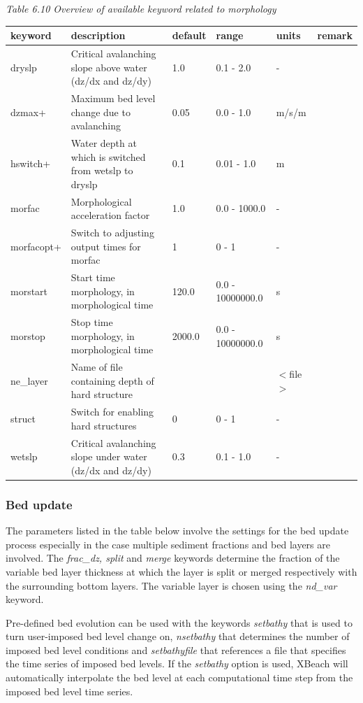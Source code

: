 \documentclass{article}
\begin{document}
\noindent \textit{Table 6.10 Overview of available keyword related to morphology}

\begin{tabular}{|p{0.7in}|p{1.0in}|p{0.6in}|p{0.8in}|p{0.5in}|p{0.6in}|} \hline 
keyword & description & default & range & units & remark \\ \hline 
dryslp & Critical avalanching slope above water (dz/dx and dz/dy) & 1.0 & 0.1 - 2.0 & - &  \\ \hline 
dzmax+ & Maximum bed level change due to avalanching & 0.05 & 0.0 - 1.0 & m/s/m &  \\ \hline 
hswitch+ & Water depth at which is switched from wetslp to dryslp & 0.1 & 0.01 - 1.0 & m &  \\ \hline 
morfac & Morphological acceleration factor & 1.0 & 0.0 - 1000.0 & - &  \\ \hline 
morfacopt+ & Switch to adjusting output times for morfac & 1 & 0 - 1 & - &  \\ \hline 
morstart & Start time morphology, in morphological time & 120.0 & 0.0 - 10000000.0 & s &  \\ \hline 
morstop & Stop time morphology, in morphological time & 2000.0 & 0.0 - 10000000.0 & s &  \\ \hline 
ne\_layer & Name of file containing depth of hard structure &  &  & $<$file$>$ &  \\ \hline 
struct & Switch for enabling hard structures & 0 & 0 - 1 & - &  \\ \hline 
wetslp & Critical avalanching slope under water (dz/dx and dz/dy) & 0.3 & 0.1 - 1.0 & - &  \\ \hline 
\end{tabular}


\subsubsection{ Bed update}

\noindent The parameters listed in the table below involve the settings for the bed update process especially in the case multiple sediment fractions and bed layers are involved. The \textit{frac\_dz, split} and \textit{merge} keywords determine the fraction of the variable bed layer thickness at which the layer is split or merged respectively with the surrounding bottom layers. The variable layer is chosen using the \textit{nd\_var} keyword.

\noindent Pre-defined bed evolution can be used with the keywords \textit{setbathy} that is used to turn user-imposed bed level change on, \textit{nsetbathy} that determines the number of imposed bed level conditions and \textit{setbathyfile} that references a file that specifies the time series of imposed bed levels. If the \textit{setbathy} option is used, XBeach will automatically interpolate the bed level at each computational time step from the imposed bed level time series. 
\end{document}
